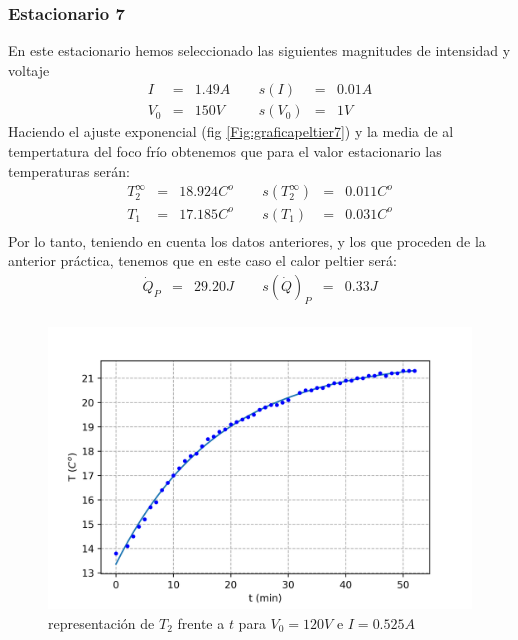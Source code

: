 \documentclass[12pt,a4paper]{article}
\begin{document}
\subsubsection{Estacionario 7}
En este estacionario hemos seleccionado las siguientes magnitudes de intensidad y voltaje  
\begin{equation} 
\begin{array}{lllllll}
I & = & 1.49 A & \ \ & s(I) & = & 0.01  A \\ 
 V_0 & = & 150 V & \ \ & s(V_0) & = & 1 V
\end{array} 
\end{equation} 
 Haciendo el ajuste exponencial (fig \ref{Fig:graficapeltier7}) y la media de al tempertatura del foco frío obtenemos que para el valor estacionario las temperaturas serán: 
\begin{equation} 
\begin{array}{lllllll}
T_2^{\infty} & = & 18.924 C^o &  \ \ &  s(T_2^{\infty}) & =  & 0.011  C^o \\ 
 T_1 & = & 17.185  C^o & \ \ & s(T_1) & = & 0.031  C^o \\ 
 \end{array} 
\end{equation} 
 Por lo tanto, teniendo en cuenta los datos anteriores, y los que proceden de la anterior práctica, tenemos que en este caso el calor peltier será: 
\begin{equation} 
\begin{array}{lllllll}
\dot{Q}_P & = & 29.20 J & \ \ & s(\dot{Q})_P & = & 0.33 J \\ 
\end{array} 
\end{equation} 
 


\begin{figure}[h!] 	 \centering 
\includegraphics[scale=1.0]{plot-peltier0.png} 
\caption{representación de $T_2$ frente a $t$ para $V_0 = 120 V$ e $I = 0.525 A$} 
\label{Fig:graficapeltier1}
\end{figure}
\end{document}
